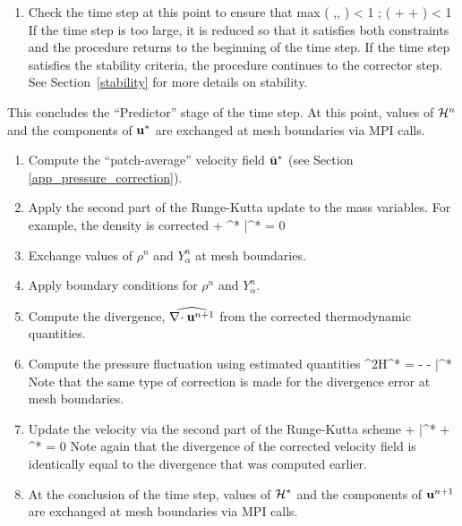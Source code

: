 \begin{enumerate}
\item Check the time step at this point to ensure that
\be \dt \; \hbox{max} \left( ,, \right) < 1 \quad ;  \; \dt \; \nu \; \left( +  +  \right) < 1 \ee
If the time step is too large, it is reduced so that it satisfies
both constraints and the procedure returns to the beginning of the time step.
If the time step satisfies the stability criteria, the procedure continues to the corrector step.
See Section~\ref{stability} for more details on stability.
\end{enumerate}

\noindent
This concludes the ``Predictor'' stage of the time step.  At this point, values of ${\cal H}^n$ and the components of ${\bf u}^*$ are exchanged at mesh boundaries via MPI calls.

\begin{enumerate}
\item Compute the ``patch-average'' velocity field $\bar{{\bf u}}^*$ (see Section \ref{app_pressure_correction}).

\item Apply the second part of the Runge-Kutta update to the mass variables. For example, the density is corrected
\be
{} +  \nabla\!\cdot \rho^* \bar{\bu}^* = 0
\ee

\item Exchange values of $\rho^n$ and $Y_\alpha^n$ at mesh boundaries.

\item Apply boundary conditions for $\rho^n$ and $Y_\alpha^n$.

\item Compute the divergence, $\widehat{\nabla\!\cdot {\bf u}^{n+1}}$ from the corrected thermodynamic quantities.

\item Compute the pressure fluctuation using estimated quantities
\be
\label{eqn_corrector_poisson2}
\nabla^2{\cal H}^* = - 
   - \nabla\!\cdot \bar{}^*
\ee
Note that the same type of correction is made for the divergence error at mesh boundaries.

\item Update the velocity via the second part of the Runge-Kutta scheme
\be
{} + \bar{}^* + ^*  = 0
\ee
Note again that the divergence of the corrected velocity field is identically equal to the divergence that was computed earlier.

\item At the conclusion of the time step, values of $\cal H^*$ and the components of ${\bf u}^{n+1}$ are exchanged at mesh boundaries via MPI calls.

\end{enumerate}





